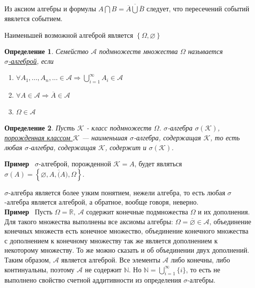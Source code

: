 \documentclass[12pt]{article}
\newtheorem{Def}{Определение}
\newenvironment{Ex}{{\bf Пример}\ }{}
\numberwithin{Th}{section}
\numberwithin{Def}{section}
\numberwithin{Lem}{section}
\numberwithin{St}{section}
\numberwithin{equation}{section}
\newcommand\Ev{\mathscr{A}} %
\begin{document}
Из аксиом алгебры и формулы $A\bigcap B = \overline{\overline{A} \bigcup \overline {B}}$ следует, что пересечений событий явялется событием.

Наименьшей возможной алгеброй является $\left\{ \Omega, \varnothing \right\}$

\begin{Def}
Семейство $\Ev$ подмножеств множества $\Omega$  называется \\ \underline{$\sigma$-алгеброй}, если 
\begin{enumerate}
	\item $\forall A_1, \dots, A_n, \ldots \in \Ev \Rightarrow \bigcup\limits_{i=1}^{\infty} A_i \in \Ev$
	\item $\forall A \in \Ev \Rightarrow \overline{A} \in \Ev$
	\item $\Omega \in \Ev$
\end{enumerate}
\end{Def}

\begin{Def}
Пусть $\mathscr{K}$ - класс подмножеств $\Omega$. $\sigma$-алгебра $\sigma (\mathscr{K})$,\\ \underline{ порожденная классом $\mathscr{K}$} --- наименьшая $\sigma$-алгебра, 
содержащая $\mathscr{K}$, то есть любая $\sigma$-алгебра, содержащая $\mathscr{K}$, содержит и $\sigma (\mathscr{K})$.
\end{Def}
\begin{Ex}
$\sigma$-алгеброй, порожденной $\mathscr{K} = A$, будет являться $\sigma(A) = \left\{ \varnothing, A, \overline(A), \Omega \right\}$.
\end{Ex}

$\sigma$-алгебра является более узким понятием, нежели алгебра, то есть любая $\sigma$-алгебра является алгеброй, а обратное, вообще говоря, неверно. \\
\begin{Ex}
Пусть $\Omega = \mathbb{R},\  \Ev$ содержит конечные подмножества $\Omega$ и их дополнения. Для такого множества выполнены все аксиомы алгебры: 
$\Omega = \overline{\varnothing} \in \Ev$, объединение конечных множеств есть конечное множество, объединение конечного множества с дополнением к конечному 
множеству так же является дополнением к некоторому множеству. То же можно сказать и об объединении двух дополнений. Таким образом, $\Ev$ является алгеброй.
Все элементы $\Ev$ либо конечны, либо континуальны, поэтому $\Ev$ не содержит $\mathbb{N}$. Но $\mathbb{N} = \bigcup\limits_{i=1}^{\infty}\{i\}$, то есть
не выполнено свойство счетной аддитивности из определения $\sigma$-алгебры.
\end{Ex}
\end{document}
